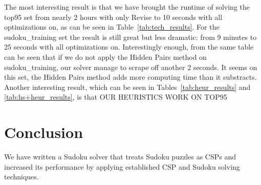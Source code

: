 \documentclass[11pt]{article} %
\begin{document}
The most interesting result is that we have brought the runtime of solving the top95 set from nearly 2 hours with only Revise to 10 seconds with all optimizations on, as can be seen in Table~\ref{tab:tech_results}. For the sudoku\_training set the result is still great but less dramatic: from 9 minutes to 25 seconds with all optimizations on. Interestingly enough, from the same table can be seen that if we do not apply the Hidden Pairs method on sudoku\_training, our solver manage to scrape off another 2 seconds. It seems on this set, the Hidden Pairs method adds more computing time than it substracts.
Another interesting result, which can be seen in Tables~\ref{tab:heur_results} and \ref{tab:hs+heur_results}, is that OUR HEURISTICS WORK ON TOP95

\section{Conclusion}

We have written a Sudoku solver that treats Sudoku puzzles as CSPs and increased its performance by applying established CSP and Sudoku solving techniques. 



\end{document}
